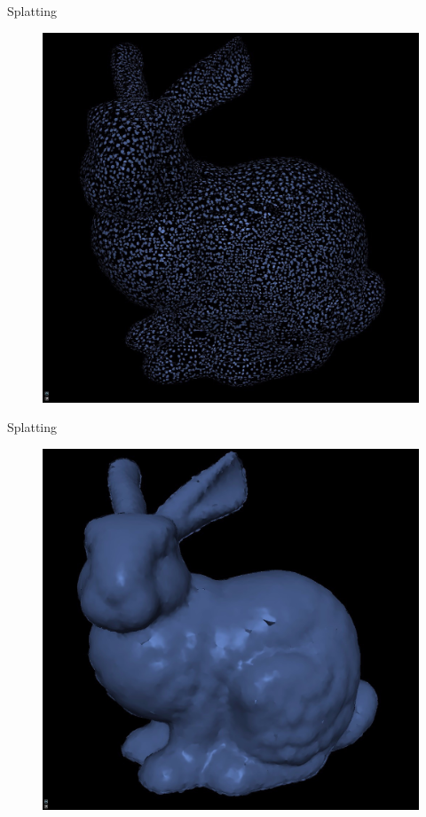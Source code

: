 \documentclass[16pt]{beamer}
\begin{document}
\begin{frame}{Splatting}
\begin{figure}[hbtp]
\centering
\includegraphics[width=\textwidth]{img/bunny_holes}
\end{figure}

\end{frame}

\begin{frame}{Splatting}
\begin{figure}[hbtp]
\centering
\includegraphics[width=\textwidth]{img/bunny_big}
\end{figure}

\end{frame}
\end{document}
